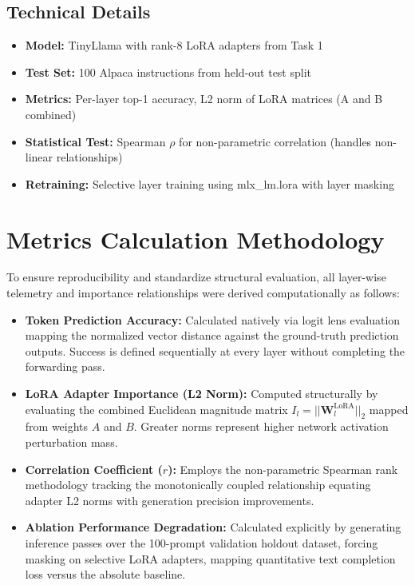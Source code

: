 \documentclass[11pt,a4paper]{article}
\begin{document}
\subsection*{Technical Details}
\begin{itemize}
    \item \textbf{Model:} TinyLlama with rank-8 LoRA adapters from Task 1
    \item \textbf{Test Set:} 100 Alpaca instructions from held-out test split
    \item \textbf{Metrics:} Per-layer top-1 accuracy, L2 norm of LoRA matrices (A and B combined)
    \item \textbf{Statistical Test:} Spearman $\rho$ for non-parametric correlation (handles non-linear relationships)
    \item \textbf{Retraining:} Selective layer training using mlx\_lm.lora with layer masking
\end{itemize}

\section*{Metrics Calculation Methodology}
To ensure reproducibility and standardize structural evaluation, all layer-wise telemetry and importance relationships were derived computationally as follows:
\begin{itemize}
    \item \textbf{Token Prediction Accuracy:} Calculated natively via logit lens evaluation mapping the normalized vector distance against the ground-truth prediction outputs. Success is defined sequentially at every layer without completing the forwarding pass.
    \item \textbf{LoRA Adapter Importance (L2 Norm):} Computed structurally by evaluating the combined Euclidean magnitude matrix $I_l = ||\mathbf{W}_l^{\mathrm{LoRA}}||_2$ mapped from weights $A$ and $B$. Greater norms represent higher network activation perturbation mass.
    \item \textbf{Correlation Coefficient ($r$):} Employs the non-parametric Spearman rank methodology tracking the monotonically coupled relationship equating adapter L2 norms with generation precision improvements.
    \item \textbf{Ablation Performance Degradation:} Calculated explicitly by generating inference passes over the 100-prompt validation holdout dataset, forcing masking on selective LoRA adapters, mapping quantitative text completion loss versus the absolute baseline.
\end{itemize}
\end{document}
